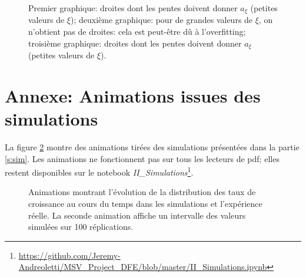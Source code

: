 \documentclass[12pt]{article}
\begin{document}
\begin{figure}[h]
\begin{center}
  \end{center}
  \caption{\label{fig:iv_verif}Premier graphique: droites dont les pentes doivent donner $a_{\xi}$ (petites valeurs de $\xi$); deuxième graphique: pour de grandes valeurs de $\xi$, on n'obtient pas de droites: cela est peut-être dû à l'overfitting; troisième graphique: droites dont les pentes doivent donner $a_{\xi}$ (petites valeurs de $\xi$).}
\end{figure}

\newpage
\section{Annexe: Animations issues des simulations\label{ann:anim}}

La figure \ref{fig:animations} montre des animations tirées des simulations présentées dans la partie \ref{s:sim}. Les animations ne fonctionnent pas sur tous les lecteurs de pdf; elles restent disponibles sur le notebook \emph{II\_Simulations}\footnote{\url{https://github.com/Jeremy-Andreoletti/MSV_Project_DFE/blob/master/II_Simulations.ipynb}}.

\begin{figure}[h]
  \begin{center}
    \vspace{3mm}
  \end{center} 
  \caption{\label{fig:animations}Animations montrant l'évolution de la distribution des taux de croissance au cours du temps dans les simulations et l'expérience réelle. La seconde animation affiche un intervalle des valeurs simulées sur 100 réplications.}
\end{figure}
\end{document}
